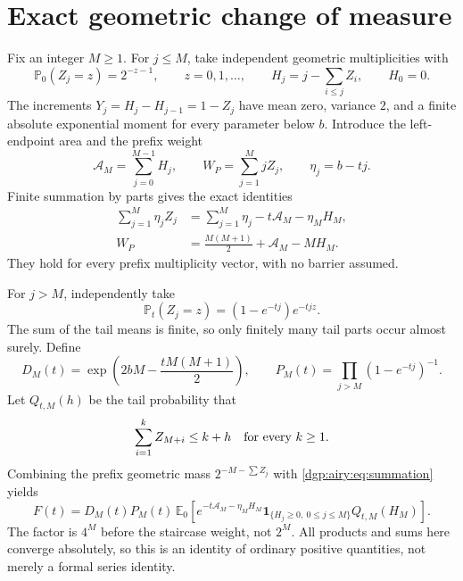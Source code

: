 \documentclass[11pt,letterpaper]{article}
\numberwithin{equation}{section}
\theoremstyle{remark}\newtheorem{remark}[theorem]{Remark}
\newcommand{\PP}{\mathbb P}
\newcommand{\EE}{\mathbb E}
\newcommand{\one}{\mathbf 1}
\newcommand{\area}{\mathcal A}
\begin{document}
\section{Exact geometric change of measure}\label{dgp:airy:sec:representation}
Fix an integer $M\geq1$. For $j\leq M$, take independent geometric
multiplicities with
\[
 \PP_0(Z_j=z)=2^{-z-1},\qquad z=0,1,\ldots,
 \qquad H_j=j-\sum_{i\leq j}Z_i,
 \qquad H_0=0.
\]
The increments $Y_j=H_j-H_{j-1}=1-Z_j$ have mean zero, variance $2$,
and a finite absolute exponential moment for every parameter below
$b$. Introduce the left-endpoint area and the prefix weight
\[
 \area_M=\sum_{j=0}^{M-1}H_j,\qquad W_P=\sum_{j=1}^M jZ_j,
 \qquad \eta_j=b-tj.
\]
Finite summation by parts gives the exact identities
\begin{align}
 \sum_{j=1}^M\eta_jZ_j
 &=\sum_{j=1}^M\eta_j-t\area_M-\eta_MH_M,\label{dgp:airy:eq:summation}\\
 W_P&=\frac{M(M+1)}2+\area_M-MH_M.\label{dgp:airy:eq:prefixweight}
\end{align}
They hold for every prefix multiplicity vector, with no barrier assumed.

For $j>M$, independently take
\[
 \PP_t(Z_j=z)=(1-e^{-tj})e^{-tjz}.
\]
The sum of the tail means is finite, so only finitely many tail parts
occur almost surely. Define
\[
 D_M(t)=\exp\!\left(2bM-\frac{tM(M+1)}2\right),\qquad
 P_M(t)=\prod_{j>M}(1-e^{-tj})^{-1}.
\]
Let $Q_{t,M}(h)$ be the tail probability that
\[
 \sum_{i=1}^k Z_{M+i}\leq k+h\quad\hbox{for every }k\geq1.
\]
Combining the prefix geometric mass $2^{-M-\sum Z_j}$ with
\eqref{dgp:airy:eq:summation} yields
\begin{equation}\label{dgp:airy:eq:walkrepresentation}
 F(t)=D_M(t)P_M(t)\,
 \EE_0\!\left[e^{-t\area_M-\eta_MH_M}
       \one_{\{H_j\geq0,\ 0\leq j\leq M\}}
       Q_{t,M}(H_M)\right].
\end{equation}
The factor is $4^M$ before the staircase weight, not $2^M$.
All products and sums here converge absolutely, so this is an identity
of ordinary positive quantities, not merely a formal series identity.
\end{document}
